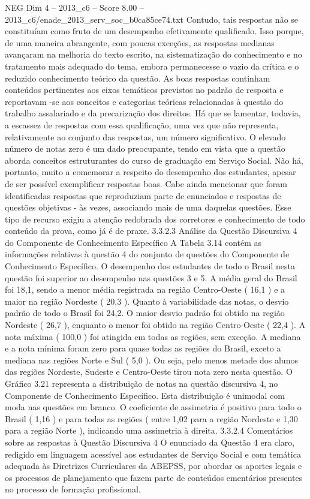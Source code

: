 \begin{textsample}{NEG Dim 4 – 2013\_c6 – Score 8.00 – 2013\_c6/enade\_2013\_serv\_soc\_b0ca85ce74.txt}
Contudo, tais respostas não se constituíam como fruto de um desempenho efetivamente qualificado.
Isso porque, de uma maneira abrangente, com poucas exceções, as respostas medianas avançaram na melhoria do texto escrito, na sistematização do conhecimento e no tratamento mais adequado do tema, embora permanecesse o vazio da crítica e o reduzido conhecimento teórico da questão.
As boas respostas continham conteúdos pertinentes aos eixos temáticos previstos no padrão de resposta e reportavam -se aos conceitos e categorias teóricas relacionadas à questão do trabalho assalariado e da precarização dos direitos.
Há que se lamentar, todavia, a escassez de respostas com essa qualificação, uma vez que não representa, relativamente ao conjunto das respostas, um número significativo.
O elevado número de notas zero é um dado preocupante, tendo em vista que a questão aborda conceitos estruturantes do curso de graduação em Serviço Social.
Não há, portanto, muito a comemorar a respeito do desempenho dos estudantes, apesar de ser possível exemplificar respostas boas.
Cabe ainda mencionar que foram identificadas respostas que reproduziam parte de enunciados e respostas de questões objetivas - às vezes, associando mais de uma daquelas questões.
Esse tipo de recurso exigiu a atenção redobrada dos corretores e conhecimento de todo conteúdo da prova, como já é de praxe. 3.3.2.3 Análise da Questão Discursiva 4 do Componente de Conhecimento Específico A Tabela 3.14 contém as informações relativas à questão 4 do conjunto de questões do Componente de Conhecimento Específico.
O desempenho dos estudantes de todo o Brasil nesta questão foi superior ao desempenho nas questões 3 e 5.
A média geral do Brasil foi 18,1, sendo a menor média registrada na região Centro-Oeste ( 16,1 ) e a maior na região Nordeste ( 20,3 ).
Quanto à variabilidade das notas, o desvio padrão de todo o Brasil foi 24,2.
O maior desvio padrão foi obtido na região Nordeste ( 26,7 ), enquanto o menor foi obtido na região Centro-Oeste ( 22,4 ).
A nota máxima ( 100,0 ) foi atingida em todas as regiões, sem exceção.
A mediana e a nota mínima foram zero para quase todas as regiões do Brasil, exceto a mediana nas regiões Norte e Sul ( 5,0 ).
Ou seja, pelo menos metade dos alunos das regiões Nordeste, Sudeste e Centro-Oeste tirou nota zero nesta questão.
O Gráfico 3.21 representa a distribuição de notas na questão discursiva 4, no Componente de Conhecimento Específico.
Esta distribuição é unimodal com moda nas questões em branco.
O coeficiente de assimetria é positivo para todo o Brasil ( 1,16 ) e para todas as regiões ( entre 1,02 para a região Nordeste e 1,30 para a região Norte ), indicando uma assimetria à direita. 3.3.2.4 Comentários sobre as respostas à Questão Discursiva 4 O enunciado da Questão 4 era claro, redigido em linguagem acessível aos estudantes de Serviço Social e com temática adequada às Diretrizes Curriculares da ABEPSS, por abordar os aportes legais e os processos de planejamento que fazem parte de conteúdos ementários presentes no processo de formação profissional.

\end{textsample}
